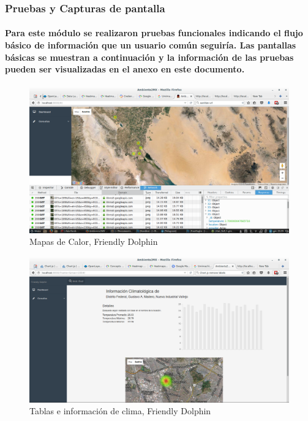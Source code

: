   \subsubsection{Pruebas y Capturas de pantalla}
    \paragraph{Para este módulo se realizaron pruebas funcionales indicando el flujo básico de información que un usuario común seguiría. Las pantallas básicas se muestran a continuación y la información de las pruebas pueden ser visualizadas en el anexo en este documento.}
    \begin{figure}[b!]
      \centering
        \includegraphics[width=\textwidth]{./images/CapturaFriendlyDolphin}
      \caption{Mapas de Calor, Friendly Dolphin}
    \end{figure}
    \begin{figure}[b!]
      \centering
        \includegraphics[width=\textwidth]{./images/CapturaFriendlyDolphin2}
      \caption{Tablas e información de clima, Friendly Dolphin}
    \end{figure}